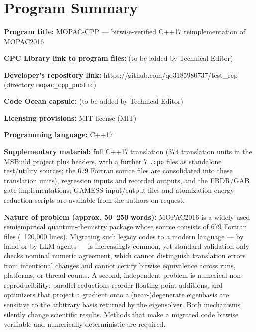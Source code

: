 \documentclass[preprint,12pt]{elsarticle}
\begin{document}
\section*{Program Summary}
\textbf{Program title:} MOPAC-CPP --- bitwise-verified C++17 reimplementation of MOPAC2016

\textbf{CPC Library link to program files:} (to be added by Technical Editor)

\textbf{Developer's repository link:} https://github.com/qq3185980737/test\_rep (directory \texttt{mopac\_cpp\_public})

\textbf{Code Ocean capsule:} (to be added by Technical Editor)

\textbf{Licensing provisions:} MIT license (MIT)

\textbf{Programming language:} C++17

\textbf{Supplementary material:} full C++17 translation (374 translation units in the MSBuild project plus headers, with a further 7 \texttt{.cpp} files as standalone test/utility sources; the 679 Fortran source files are consolidated into these translation units), regression inputs and recorded outputs, and the FBDR/GAB gate implementations; GAMESS input/output files and atomization-energy reduction scripts are available from the authors on request.

\textbf{Nature of problem (approx. 50--250 words):} MOPAC2016 is a widely used semiempirical quantum-chemistry package whose source consists of 679 Fortran files (~120,000 lines). Migrating such legacy codes to a modern language --- by hand or by LLM agents --- is increasingly common, yet standard validation only checks nominal numeric agreement, which cannot distinguish translation errors from intentional changes and cannot certify bitwise equivalence across runs, platforms, or thread counts. A second, independent problem is numerical non-reproducibility: parallel reductions reorder floating-point additions, and optimizers that project a gradient onto a (near-)degenerate eigenbasis are sensitive to the arbitrary basis returned by the eigensolver. Both mechanisms silently change scientific results. Methods that make a migrated code bitwise verifiable and numerically deterministic are required.
\end{document}
